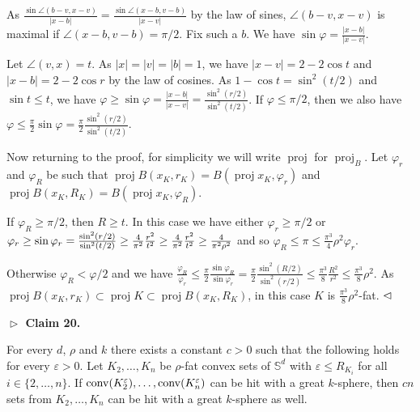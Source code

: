 \documentclass[10pt,a4paper]{amsart}
\begin{document}
\par
\par
As $\frac{\sin\angle(b-v,x-v)}{|x-b|}=\frac{\sin\angle(x-b,v-b)}{|x-v|}$ by the law of sines, $\angle(b-v,x-v)$ is maximal if $\angle(x-b,v-b)=\pi/2$. Fix such a $b$. We have $\sin\varphi=\frac{|x-b|}{|x-v|}$.
\par
\par
Let $\angle(v,x)=t$. As $|x|=|v|=|b|=1$, we have $|x-v|=2-2\cos t$ and $|x-b|=2-2\cos r$ by the law of cosines. As $1-\cos t=\sin^{2}(t/2)$ and $\sin t\leq t$, we have $\varphi\geq\sin\varphi=\frac{|x-b|}{|x-v|}=\frac{\sin^{2}(r/2)}{\sin^{2}(t/2)}$. If $\varphi\leq\pi/2$, then we also have $\varphi\leq\frac{\pi}{2}\sin\varphi=\frac{\pi}{2}\frac{\sin^{2}(r/2)}{\sin^{2}%
(t/2)}$.
\par
\par
Now returning to the proof, for simplicity we will write $\operatorname{proj}$ for $\operatorname{proj}_{B}$. Let $\varphi_{r}$ and $\varphi_{R}$ be such that $\operatorname{proj}B(x_{K},r_{K})=B(\operatorname{proj}x_{K},\varphi_{r})$ and $\operatorname{proj}B(x_{K},R_{K})=B(\operatorname{proj}x_{K},\varphi_{R})$.
\par
\par
If $\varphi_{R}\geq\pi/2$, then $R\geq t$. In this case we have either $\varphi_{r}\geq\pi/2$ or $\varphi_{r}\geq\sin\varphi_{r}=\frac{\sin^{2}(r/2)}{\sin^{2}(t/2)}\geq\frac{4}%
{\pi^{2}}\frac{r^{2}}{t^{2}}\geq\frac{4}{\pi^{2}}\frac{r^{2}}{t^{2}}\geq\frac{%
4}{\pi^{2}\rho^{2}}$ and so $\varphi_{R}\leq\pi\leq\frac{\pi^{3}}{4}\rho^{2}\varphi_{r}$.
\par
\par
Otherwise $\varphi_{R}<\varphi/2$ and we have $\frac{\varphi_{R}}{\varphi_{r}}\leq\frac{\pi}{2}\frac{\sin\varphi_{R}}{\sin%
\varphi_{r}}=\frac{\pi}{2}\frac{\sin^{2}(R/2)}{\sin^{2}(r/2)}\leq\frac{\pi^{3}%
}{8}\frac{R^{2}}{r^{2}}\leq\frac{\pi^{3}}{8}\rho^{2}$. As $\operatorname{proj}B(x_{K},r_{K})\subset\operatorname{proj}K\subset%
\operatorname{proj}B(x_{K},R_{K})$, in this case $K$ is $\frac{\pi^{3}}{8}\rho^{2}$-fat. $\hfill\vartriangleleft$
\par
\par
\par\medskip\noindent\textbf{$\vartriangleright$ Claim 20.}\par
For every $d$, $\rho$ and $k$ there exists a constant $c>0$ such that the following holds for every $\varepsilon>0$. Let $K_{2},\ldots,K_{n}$ be $\rho$-fat convex sets of $\mathbb{S}^{d}$ with $\varepsilon\leq R_{K_{i}}$ for all $i\in\{2,\ldots,n\}$. If $\operatorname{conv}(K_{2}^{\varepsilon}),\ldots,\operatorname{conv}(K_{n}^{%
\varepsilon})$ can be hit with a great $k$-sphere, then $cn$ sets from $K_{2},\ldots,K_{n}$ can be hit with a great $k$-sphere as well.
\end{document}
